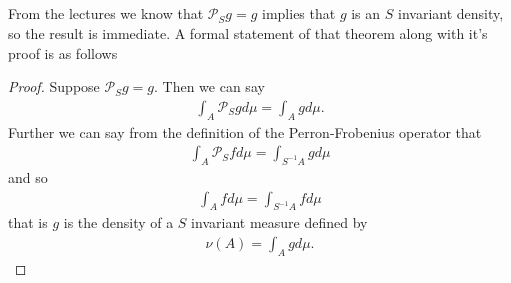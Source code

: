 \documentclass{unswmaths}
\begin{document}
\subsection{}
From the lectures we know that $ \mathcal{P}_S g = g $ implies that $ g $ is an $ S $ invariant density, so the result is immediate.
A formal statement of that theorem along with it's proof is as follows
\begin{theorem}
\end{theorem}
\begin{proof}
  Suppose $ \mathcal{P}_{S} g = g $. Then we can say
  \begin{align}
    \int_A \mathcal{P}_S g d\mu = \int_A g d\mu.
  \end{align}
  Further we can say from the definition of the Perron-Frobenius operator that
  \begin{align}
    \int_A \mathcal{P}_{S} f d\mu = \int_{S^{-1}A} g d\mu
  \end{align}
  and so
  \begin{align}
    \int_A f d\mu = \int_{S^{-1}A} f d\mu
  \end{align}
  that is $ g $ is the density of a $ S $ invariant measure defined by
  \begin{align}
    \nu(A) = \int_{A} g d\mu.
  \end{align}
\end{proof}
\end{document}
